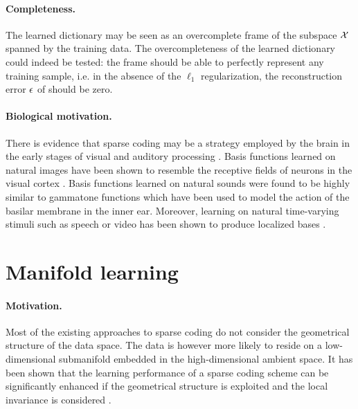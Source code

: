 \paragraph{Completeness.}
The learned dictionary may be seen as an overcomplete frame of the subspace $\mathcal{X}$ spanned by the training data. The overcompleteness of the learned dictionary could indeed be tested: the frame should be able to perfectly represent any training sample, i.e. in the absence of the $\ell_1$ regularization, the reconstruction error $\mathbf{\epsilon}$ of  should be zero.

\paragraph{Biological motivation.}
There is evidence that sparse coding may be a strategy employed by the brain in the early stages of visual and auditory processing \cite{olshausen1996SparseV1, olshausen1997SparseV1, smith2006SparseAudio}. Basis functions learned on natural images have been shown to resemble the receptive fields of neurons in the visual cortex \cite{olshausen1996SparseV1, olshausen1997SparseV1}. Basis functions learned on natural sounds were found to be highly similar to gammatone functions \cite{smith2006SparseAudio} which have been used to model the action of the basilar membrane in the inner ear. Moreover, learning on natural time-varying stimuli such as speech or video has been shown to produce localized bases \cite{lewicki2000SparseSpeech, olshausen2000SparseVideo}.

\section{Manifold learning} \label{sec:manifold_learning}

\paragraph{Motivation.}
Most of the existing approaches to sparse coding do not consider the geometrical structure of the data space. The data is however more likely to reside on a low-dimensional submanifold embedded in the high-dimensional ambient space.
It has been shown that the learning performance of a sparse coding scheme can be significantly enhanced if the geometrical structure is exploited and the local invariance is considered \cite{zheng2011StructuredSparse}.

